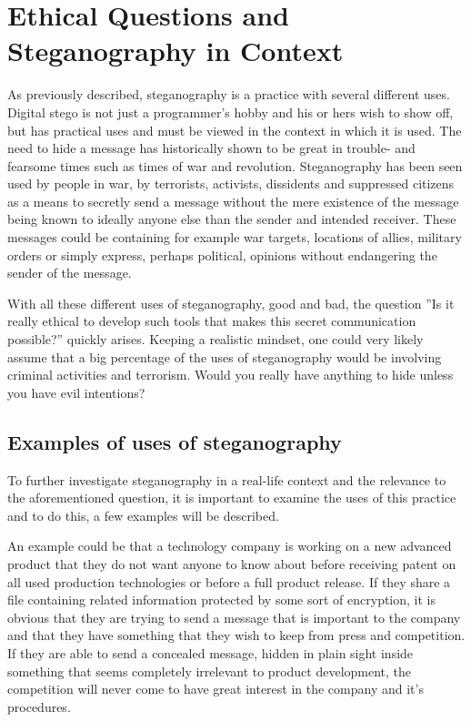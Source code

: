 \section{Ethical Questions and Steganography in Context}
As previously described, steganography is a practice with several different uses.
Digital stego is not just a programmer's hobby and his or hers wish to show off, but has practical uses and must be viewed in the context in which it is used.
The need to hide a message has historically shown to be great in trouble- and fearsome times such as times of war and revolution.
Steganography has been seen used by people in war, by terrorists, activists, dissidents and suppressed citizens as a means to secretly send a message without the mere existence of the message being known to ideally anyone else than the sender and intended receiver.
These messages could be containing for example war targets, locations of allies, military orders or simply express, perhaps political, opinions without endangering the sender of the message.


With all these different uses of steganography, good and bad, the question ''Is it really ethical to develop such tools that makes this secret communication possible?'' quickly arises. Keeping a realistic mindset, one could very likely assume that a big percentage of the uses of steganography would be involving criminal activities and terrorism. Would you really have anything to hide unless you have evil intentions?

\subsection{Examples of uses of steganography}
To further investigate steganography in a real-life context and the relevance to the aforementioned question, it is important to examine the uses of this practice and to do this, a few examples will be described.

An example could be that a technology company is working on a new advanced product that they do not want anyone to know about before receiving patent on all used production technologies or before a full product release.
If they share a file containing related information protected by some sort of encryption, it is obvious that they are trying to send a message that is important to the company and that they have something that they wish to keep from press and competition.
If they are able to send a concealed message, hidden in plain sight inside something that seems completely irrelevant to product development, the competition will never come to have great interest in the company and it's procedures.

